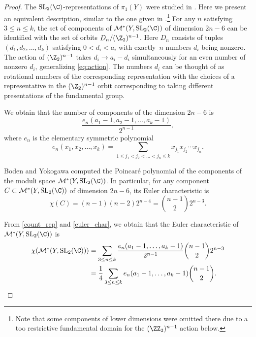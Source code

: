 \documentclass[pdftex]{sigma}
\begin{document}
\begin{proof}

The $\operatorname{SL}_2(\C)$-representations of $\pi_1(Y)$ were studied in \cite[proof of Theorem 2.7]{BC06}. Here we present an equivalent description, similar to the one given in \cite{AM22}.\footnote{Note that some components of lower dimensions were omitted there due to a too restrictive fundamental domain for the $(\ZZ_2)^{n-1}$ action below.}
For any $n$ satisfying~${3 \leq n \leq k}$, the set of components of $\mathcal{M}^*(Y, \operatorname{SL}_2(\C))$ of dimension $2n-6$ can be identified with the set of orbits
$
D_n/(\Z_2)^{n-1}$.
Here $D_n$ consists of tuples $(d_1, d_2, \dots, d_k)$ satisfying $0<d_i<a_i$ with exactly~$n$ numbers $d_i$ being nonzero. The action of $(\Z_2)^{n-1}$ takes $d_i \rightarrow a_i - d_i$ simultaneously for an even number of nonzero $d_i$, generalizing \eqref{eq:action}. The numbers $d_i$ can be thought of as rotational numbers of the corresponding representation with the choices of a representative in the $(\Z_2)^{n-1}$ orbit corresponding to taking different presentations of the fundamental group.

We obtain that the number of components of the dimension $2n-6$ is
\begin{equation}\label{count_rep}
	\frac{e_n(a_1-1, a_2-1, \dots, a_k-1)}{2^{n-1}},
\end{equation}
where $e_n$ is the elementary symmetric polynomial
\[
	e_n(x_1, x_2, \dots, x_k) = \sum_{1\leq j_1 < j_2 <\dots <j_n \leq k} x_{j_1}x_{j_2}\cdots x_{j_n}.
\]

Boden and Yokogawa \cite{BoYo96} computed the Poincar\'e polynomial of the components of the moduli space $\mathcal{M}^*(Y, \operatorname{SL}_2(\C))$. In particular, for any component $C \subset \mathcal{M}^*(Y, \operatorname{SL}_2(\C))$ of dimension $2n-6$, its Euler characteristic is
\begin{equation}\label{euler_char}
	\chi(C) = (n-1)(n-2)2^{n-4} = \binom{n-1}{2}2^{n-3}.
\end{equation}

From \eqref{count_rep} and \eqref{euler_char}, we obtain that the Euler characteristic of $\mathcal{M}^*(Y, \operatorname{SL}_2(\C))$ is
\begin{align}
\chi(\mathcal{M}^*(Y, \operatorname{SL}_2(\C))) &=
 \sum_{3 \leq n \leq k } \frac{e_n(a_1-1, \dots, a_k-1)}{2^{n-1}} \binom{n-1}{2}2^{n-3}\nonumber \\
 &= \frac14 \sum_{3 \leq n \leq k } e_n(a_1-1, \dots, a_k-1) \binom{n-1}{2}.\label{eq:euler_char_moduli}
\end{align}


\end{proof}
\end{document}
